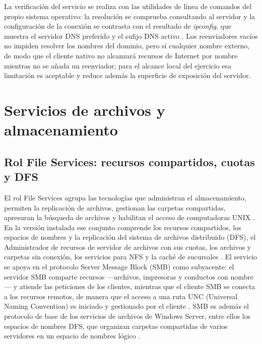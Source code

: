 \documentclass[12pt]{article}
\begin{document}
La verificación del servicio se realiza con las utilidades de línea de comandos del propio sistema operativo: la resolución se comprueba consultando al servidor y la configuración de la conexión se contrasta con el resultado de \textit{ipconfig}, que muestra el servidor DNS preferido y el sufijo DNS activo \parencite{microsoftDnsOverview}. Los reenviadores vacíos no impiden resolver los nombres del dominio, pero sí cualquier nombre externo, de modo que el cliente nativo no alcanzará recursos de Internet por nombre mientras no se añada un reenviador; para el alcance local del ejercicio esa limitación es aceptable y reduce además la superficie de exposición del servidor.

\section{Servicios de archivos y almacenamiento}
\label{sec:serviciosArchivos}

\subsection{Rol File Services: recursos compartidos, cuotas y DFS}
\label{sec:rolFileServices}

El rol File Services agrupa las tecnologías que administran el almacenamiento, permiten la replicación de archivos, gestionan las carpetas compartidas, apresuran la búsqueda de archivos y habilitan el acceso de computadoras UNIX \parencite{microsoftRoleFileServices}. En la versión instalada ese conjunto comprende los recursos compartidos, los espacios de nombres y la replicación del sistema de archivos distribuido (DFS), el Administrador de recursos de servidor de archivos con sus cuotas, los archivos y carpetas sin conexión, los servicios para NFS y la caché de sucursales \parencite{microsoftFileServices2008r2}. El servicio se apoya en el protocolo Server Message Block (SMB) como subyacente: el servidor SMB comparte recursos ---archivos, impresoras y conductos con nombre--- y atiende las peticiones de los clientes, mientras que el cliente SMB se conecta a los recursos remotos, de manera que el acceso a una ruta UNC (Universal Naming Convention) es iniciado y gestionado por el cliente \parencite{microsoftSmbOverview}. SMB es además el protocolo de base de los servicios de archivos de Windows Server, entre ellos los espacios de nombres DFS, que organizan carpetas compartidas de varios servidores en un espacio de nombres lógico \parencite{microsoftSmbOverview}.
\end{document}
